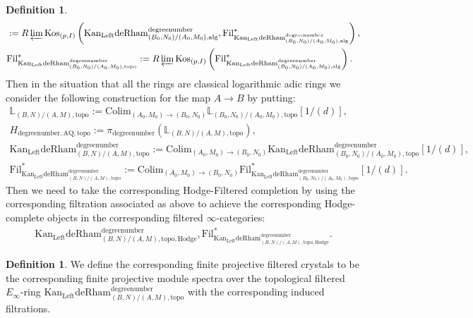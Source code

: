\documentclass[11pt]{book}
\theoremstyle{definition}
\newtheorem{definition}[theorem]{Definition}
\numberwithin{equation}{section}
\begin{document}
\begin{definition}
\begin{align}
&:=R\varprojlim  \mathrm{Kos}_{(p,I)}\left(\mathrm{Kan}_\mathrm{Left}\mathrm{deRham}^\text{degreenumber}_{(B_0,N_0)/(A_0,M_0),\mathrm{alg}},\mathrm{Fil}^*_{\mathrm{Kan}_\mathrm{Left}\mathrm{deRham}^\text{degreenumber}_{(B_0,N_0)/(A_0,M_0),\mathrm{alg}}}\right),\\
&\mathrm{Fil}^*_{\mathrm{Kan}_\mathrm{Left}\mathrm{deRham}^\text{degreenumber}_{(B_0,N_0)/(A_0,M_0),\mathrm{topo}}}:=R\varprojlim \mathrm{Kos}_{(p,I)} \left(\mathrm{Fil}^*_{\mathrm{Kan}_\mathrm{Left}\mathrm{deRham}^\text{degreenumber}_{(B_0,N_0)/(A_0,M_0),\mathrm{alg}}}\right).	
\end{align}
Then in the situation that all the rings are classical logarithmic adic rings we consider the following construction for the map $A\rightarrow B$ by putting:
\begin{align}
\mathbb{L}_{(B,N)/(A,M),\mathrm{topo}}:= \mathrm{Colim}_{(A_0,M_0)\rightarrow (B_0,N_0)}\mathbb{L}_{(B_0,N_0)/(A_0,M_0),\mathrm{topo}}[1/(d)],\\
H_{\text{degreenumber},{\mathrm{AQ}},\mathrm{topo}}:=\pi_\text{degreenumber} (\mathbb{L}_{(B,N)/(A,M),\mathrm{topo}}),	\\
\mathrm{Kan}_\mathrm{Left}\mathrm{deRham}^\text{degreenumber}_{(B,N)/(A,M),\mathrm{topo}}:=\mathrm{Colim}_{(A_0,M_0)\rightarrow (B_0,N_0)}\mathrm{Kan}_\mathrm{Left}\mathrm{deRham}^\text{degreenumber}_{(B_0,N_0)/(A_0,M_0),\mathrm{topo}}[1/(d)],\\
\mathrm{Fil}^*_{\mathrm{Kan}_\mathrm{Left}\mathrm{deRham}^\text{degreenumber}_{(B,N)/(A,M),\mathrm{topo}}}:=\mathrm{Colim}_{(A_0,M_0)\rightarrow (B_0,N_0)}\mathrm{Fil}^*_{\mathrm{Kan}_\mathrm{Left}\mathrm{deRham}^\text{degreenumber}_{(B_0,N_0)/(A_0,M_0),\mathrm{topo}}}[1/(d)].
\end{align}
Then we need to take the corresponding Hodge-Filtered completion by using the corresponding filtration associated as above to achieve the corresponding Hodge-complete objects in the corresponding filtered $\infty$-categories:
\begin{align}
{\mathrm{Kan}_\mathrm{Left}\mathrm{deRham}}^\text{degreenumber}_{(B,N)/(A,M),\mathrm{topo,Hodge}},\mathrm{Fil}^*_{{\mathrm{Kan}_\mathrm{Left}\mathrm{deRham}}^\text{degreenumber}_{(B,N)/(A,M),\mathrm{topo,Hodge}}}.	
\end{align}
\end{definition}



\begin{definition}
We define the corresponding finite projective filtered crystals to be the corresponding finite projective module spectra over the topological filtered $E_\infty$-ring $\mathrm{Kan}_\mathrm{Left}\mathrm{deRham}^\text{degreenumber}_{(B,N)/{(A,M)},\mathrm{topo}}$ with the corresponding induced filtrations.	
\end{definition}
\end{document}
